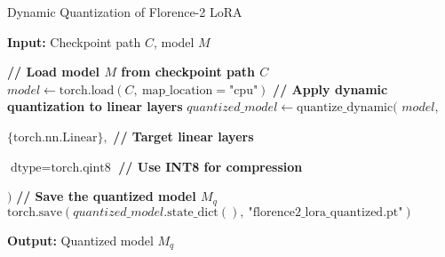 \begin{algorithm}
\caption{Dynamic Quantization of Florence-2 LoRA}
\label{alg:dynamic_quant}
\noindent\textbf{Input:} Checkpoint path $C$, model $M$
\begin{algorithmic}[1]
\State \textbf{// Load model $M$ from checkpoint path $C$}
\State $model \gets \text{torch.load}(C,\ \text{map\_location} = \text{"cpu"})$
\State \textbf{// Apply dynamic quantization to linear layers}
\State $quantized\_model \gets \text{quantize\_dynamic}( $
\hspace{2em}$model,$

\hspace{2em}$\{\text{torch.nn.Linear}\},$ \textbf{// Target linear layers}

\hspace{2em}$\text{dtype} = \text{torch.qint8}$ \textbf{// Use INT8 for compression}

$)$
\State \textbf{// Save the quantized model $M_q$}
\State $\text{torch.save}(quantized\_model.\text{state\_dict}(),\ \text{"florence2\_lora\_quantized.pt"})$
\end{algorithmic}
\noindent\textbf{Output:} Quantized model $M_q$
\end{algorithm}
